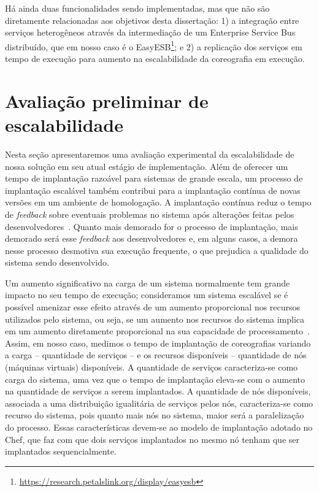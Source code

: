 Há ainda duas funcionalidades sendo implementadas, mas que não são diretamente relacionadas aos objetivos desta dissertação: 1) a integração entre serviços heterogêneos através da intermediação de um Enterprise  Service Bus distribuído, que em nosso caso é o EasyESB\footnote{\url{https://research.petalslink.org/display/easyesb}}; e 2) a replicação dos serviços em tempo de execução para aumento na escalabilidade da coreografia em execução.

\section{Avaliação preliminar de escalabilidade}
\label{sec:avaliacao}

Nesta seção apresentaremos uma avaliação experimental da escalabilidade de nossa solução em seu atual estágio de implementação. Além de oferecer um tempo de implantação razoável para sistemas de grande escala, um processo de implantação escalável também contribui para a implantação contínua de novas versões em um ambiente de homologação. A implantação contínua reduz o tempo de \textit{feedback} sobre eventuais problemas no sistema após alterações feitas pelos desenvolvedores~\cite{Humble2011Continuous}. Quanto mais demorado for o processo de implantação, mais demorado será esse \textit{feedback} aos desenvolvedores e, em alguns casos, a demora nesse processo desmotiva sua execução frequente, o que prejudica a qualidade do sistema sendo desenvolvido.

Um aumento significativo na carga de um sistema normalmente tem grande impacto no seu tempo de execução; consideramos um sistema escalável se é possível amenizar esse efeito através de um aumento proporcional nos recursos utilizados pelo sistema, ou seja, se um aumento nos recursos do sistema implica em um aumento diretamente proporcional na sua capacidade de processamento~\cite{Law1998Scalable}. Assim, em nosso caso, medimos o tempo de implantação de coreografias variando a carga -- quantidade de serviços -- e os recursos disponíveis -- quantidade de nós (máquinas virtuais) disponíveis. A quantidade de serviços caracteriza-se como carga do sistema, uma vez que o tempo de implantação eleva-se com o aumento na quantidade de serviços a serem implantados. A quantidade de nós disponíveis, associada a uma distribuição igualitária de serviços pelos nós, caracteriza-se como recurso do sistema, pois quanto mais nós no sistema, maior será a paralelização do processo. Essas características devem-se ao modelo de implantação adotado no Chef, que faz com que dois serviços implantados no mesmo nó tenham que ser implantados sequencialmente.

